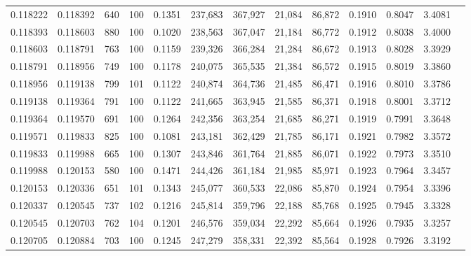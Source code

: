 \begin{tabular}{rrrrrrrrrrrrr}
0.118222 & 0.118392 &   640 & 100 &                                     0.1351 & 237,683 & 367,927 &  21,084 &  86,872 & 0.1910 & 0.8047 & 3.4081 \\
0.118393 & 0.118603 &   880 & 100 &                                     0.1020 & 238,563 & 367,047 &  21,184 &  86,772 & 0.1912 & 0.8038 & 3.4000 \\
0.118603 & 0.118791 &   763 & 100 &                                     0.1159 & 239,326 & 366,284 &  21,284 &  86,672 & 0.1913 & 0.8028 & 3.3929 \\
0.118791 & 0.118956 &   749 & 100 &                                     0.1178 & 240,075 & 365,535 &  21,384 &  86,572 & 0.1915 & 0.8019 & 3.3860 \\
0.118956 & 0.119138 &   799 & 101 &                                     0.1122 & 240,874 & 364,736 &  21,485 &  86,471 & 0.1916 & 0.8010 & 3.3786 \\
0.119138 & 0.119364 &   791 & 100 &                                     0.1122 & 241,665 & 363,945 &  21,585 &  86,371 & 0.1918 & 0.8001 & 3.3712 \\
0.119364 & 0.119570 &   691 & 100 &                                     0.1264 & 242,356 & 363,254 &  21,685 &  86,271 & 0.1919 & 0.7991 & 3.3648 \\
0.119571 & 0.119833 &   825 & 100 &                                     0.1081 & 243,181 & 362,429 &  21,785 &  86,171 & 0.1921 & 0.7982 & 3.3572 \\
0.119833 & 0.119988 &   665 & 100 &                                     0.1307 & 243,846 & 361,764 &  21,885 &  86,071 & 0.1922 & 0.7973 & 3.3510 \\
0.119988 & 0.120153 &   580 & 100 &                                     0.1471 & 244,426 & 361,184 &  21,985 &  85,971 & 0.1923 & 0.7964 & 3.3457 \\
0.120153 & 0.120336 &   651 & 101 &                                     0.1343 & 245,077 & 360,533 &  22,086 &  85,870 & 0.1924 & 0.7954 & 3.3396 \\
0.120337 & 0.120545 &   737 & 102 &                                     0.1216 & 245,814 & 359,796 &  22,188 &  85,768 & 0.1925 & 0.7945 & 3.3328 \\
0.120545 & 0.120703 &   762 & 104 &                                     0.1201 & 246,576 & 359,034 &  22,292 &  85,664 & 0.1926 & 0.7935 & 3.3257 \\
0.120705 & 0.120884 &   703 & 100 &                                     0.1245 & 247,279 & 358,331 &  22,392 &  85,564 & 0.1928 & 0.7926 & 3.3192 \\

\end{tabular}
